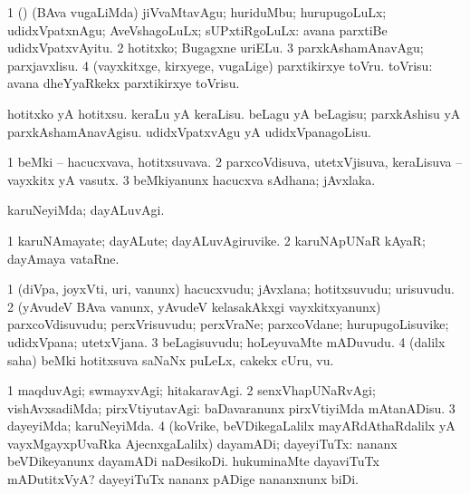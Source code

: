 \noindent
\gl{\akirx}
\bmng
\bnum
\num{1} (\rUpa) (BAva \mo vugaLiMda) jiVvaMtavAgu; huriduMbu; hurupugoLuLx; udidxVpatxnAgu; AveVshagoLuLx; sUPxtiRgoLuLx:  avana parxtiBe udidxVpatxvAyitu. 
\num{2} hotitxko; Bugagxne uriELu. 
\num{3} parxkAshamAnavAgu; parxjavxlisu. 
\num{4} (vayxkitxge, kirxyege, \mo vugaLige) parxtikirxye toVru. toVrisu:  avana dheYyaRkekx parxtikirxye toVrisu. 
\enum
\emng

\noindent
\gl{\pagu}
\bmng
{} 
\banum
{} hotitxko yA hotitxsu. 
 keraLu yA keraLisu. 
 beLagu yA beLagisu; parxkAshisu yA parxkAshamAnavAgisu. 
 udidxVpatxvAgu yA udidxVpanagoLisu. 
\eanum
\emng
\eentry

\bentry
{}
\gl{\nA}
\bmng
\bnum
\num{1} beMki -- hacucxvava, hotitxsuvava. 
\num{2} parxcoVdisuva, utetxVjisuva, keraLisuva -- vayxkitx yA vasutx. 
\num{3} beMkiyanunx hacucxva sAdhana; jAvxlaka. 
\enum
\emng
\eentry

\bentry
{}
\gl{\kirxvi}
\bmng
karuNeyiMda; dayALuvAgi. 
\emng
\eentry

\bentry
{}
\gl{\nA}
\bmng
\bnum
\num{1} karuNAmayate; dayALute; dayALuvAgiruvike. 
\num{2} karuNApUNaR kAyaR; dayAmaya vataRne. 
\enum
\emng
\eentry

\bentry
{}
\gl{\nA}
\bmng
\bnum
\num{1} (diVpa, joyxVti, uri, \mo vanunx) hacucxvudu; jAvxlana; hotitxsuvudu; urisuvudu. 
\num{2} (yAvudeV BAva \mo vanunx, yAvudeV kelasakAkxgi vayxkitxyanunx) parxcoVdisuvudu; perxVrisuvudu; perxVraNe; parxcoVdane; hurupugoLisuvike; udidxVpana; utetxVjana. 
\num{3} beLagisuvudu; hoLeyuvaMte mADuvudu. 
\num{4} (\bava dalilx saha) beMki hotitxsuva saNaNx puLeLx, cakekx cUru, \mo vu. 
\enum
\emng
\eentry

\bentry
{}
\gl{\kirxvi}
\bmng
\bnum
\num{1} maqduvAgi; swmayxvAgi; hitakaravAgi. 
\num{2} senxVhapUNaRvAgi; vishAvxsadiMda; pirxVtiyutavAgi:  baDavaranunx pirxVtiyiMda mAtanADisu. 
\num{3} dayeyiMda; karuNeyiMda. 
\num{4} (koVrike, beVDikegaLalilx mayARdAthaRdalilx yA vayxMgayxpUvaRka AjecnxgaLalilx) dayamADi; dayeyiTuTx:  nananx beVDikeyanunx dayamADi naDesikoDi.  hukuminaMte dayaviTuTx mADutitxVyA?  dayeyiTuTx nananx pADige nananxnunx biDi. 
\enum
\emng

